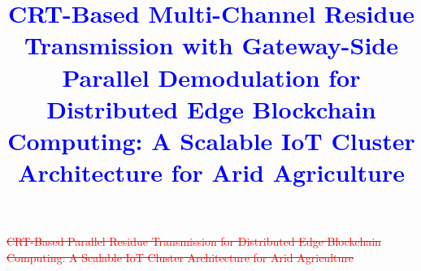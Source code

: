 \documentclass[pdflatex,sn-mathphys-num]{sn-jnl}
\theoremstyle{thmstyleone}
\theoremstyle{thmstyletwo}
\theoremstyle{thmstylethree}
\begin{document}
\hfuzz=500pt\vfuzz=20pt

\textcolor{red}{\sout{CRT-Based Parallel Residue Transmission for Distributed Edge Blockchain Computing: A Scalable IoT Cluster Architecture for Arid Agriculture}}
\title[CRT-Based Multi-Channel Residue Transmission for Distributed Edge Blockchain Computing]{
\textcolor{blue}{  CRT-Based Multi-Channel Residue Transmission with Gateway-Side Parallel Demodulation for Distributed Edge Blockchain Computing: A Scalable IoT Cluster Architecture for Arid Agriculture}
}

\author*[1]{ }
\author[1]{ }
\author[1]{ }
\author[2]{ }

\end{document}
